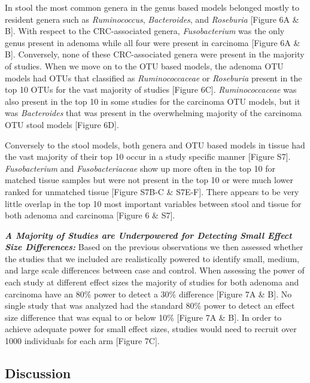 \documentclass[12pt,]{article}
\begin{document}
In stool the most common genera in the genus based models belonged
mostly to resident genera such as \emph{Ruminococcus},
\emph{Bacteroides}, and \emph{Roseburia} {[}Figure 6A \& B{]}. With
respect to the CRC-associated genera, \emph{Fusobacterium} was the only
genus present in adenoma while all four were present in carcinoma
{[}Figure 6A \& B{]}. Conversely, none of these CRC-associated genera
were present in the majority of studies. When we move on to the OTU
based models, the adenoma OTU models had OTUs that classified as
\emph{Ruminococcaceae} or \emph{Roseburia} present in the top 10 OTUs
for the vast majority of studies {[}Figure 6C{]}. \emph{Ruminococcaceae}
was also present in the top 10 in some studies for the carcinoma OTU
models, but it was \emph{Bacteroides} that was present in the
overwhelming majority of the carcinoma OTU stool models {[}Figure 6D{]}.

Conversely to the stool models, both genera and OTU based models in
tissue had the vast majority of their top 10 occur in a study specific
manner {[}Figure S7{]}. \emph{Fusobacterium} and \emph{Fusobacteriaceae}
show up more often in the top 10 for matched tissue samples but were not
present in the top 10 or were much lower ranked for unmatched tissue
{[}Figure S7B-C \& S7E-F{]}. There appears to be very little overlap in
the top 10 most important variables between stool and tissue for both
adenoma and carcinoma {[}Figure 6 \& S7{]}.

\textbf{\emph{A Majority of Studies are Underpowered for Detecting Small
Effect Size Differences:}} Based on the previous observations we then
assessed whether the studies that we included are realistically powered
to identify small, medium, and large scale differences between case and
control. When assessing the power of each study at different effect
sizes the majority of studies for both adenoma and carcinoma have an
80\% power to detect a 30\% difference {[}Figure 7A \& B{]}. No single
study that was analyzed had the standard 80\% power to detect an effect
size difference that was equal to or below 10\% {[}Figure 7A \& B{]}. In
order to achieve adequate power for small effect sizes, studies would
need to recruit over 1000 individuals for each arm {[}Figure 7C{]}.

\newpage

\subsection{Discussion}\label{discussion}
\end{document}

